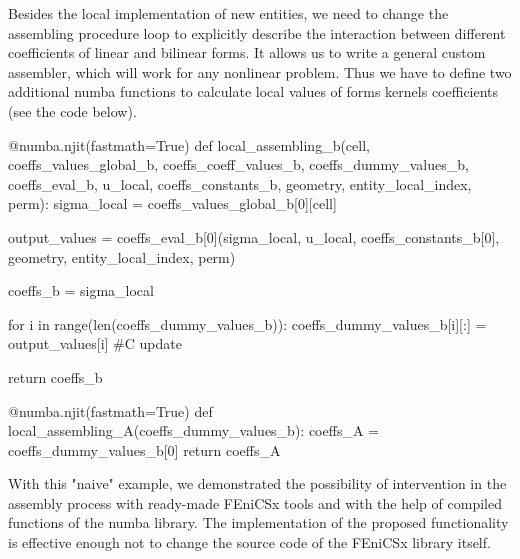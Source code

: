 \documentclass[12pt]{article}
\begin{document}
Besides the local implementation of new entities, we need to change the assembling procedure loop to explicitly describe the interaction between different coefficients of linear and bilinear forms. It allows us to write a general custom assembler, which will work for any nonlinear problem. Thus we have to define two additional numba functions to calculate local values of forms kernels coefficients (see the code below).

\begin{pythoncode}
    @numba.njit(fastmath=True)
    def local_assembling_b(cell, coeffs_values_global_b, coeffs_coeff_values_b, coeffs_dummy_values_b, coeffs_eval_b, 
                           u_local, coeffs_constants_b, geometry, entity_local_index, perm):
        sigma_local = coeffs_values_global_b[0][cell]
        
        output_values = coeffs_eval_b[0](sigma_local, 
                                         u_local, 
                                         coeffs_constants_b[0], 
                                         geometry, entity_local_index, perm)
    
        coeffs_b = sigma_local
    
        for i in range(len(coeffs_dummy_values_b)):
            coeffs_dummy_values_b[i][:] = output_values[i] #C update
    
        return coeffs_b
    
    @numba.njit(fastmath=True)
    def local_assembling_A(coeffs_dummy_values_b):
        coeffs_A = coeffs_dummy_values_b[0]
        return coeffs_A
\end{pythoncode}

With this "naive" example, we demonstrated the possibility of intervention in the assembly process with ready-made FEniCSx tools and with the help of compiled functions of the numba library. The implementation of the proposed functionality is effective enough not to change the source code of the FEniCSx library itself.
\end{document}
